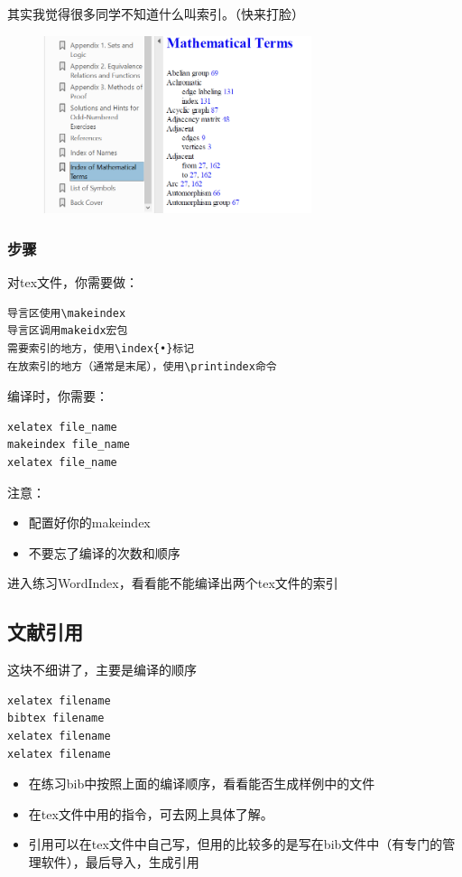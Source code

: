     \begin{frame}[fragile]
    其实我觉得很多同学不知道什么叫索引。（快来打脸）
    \begin{figure}
    \centering
    \includegraphics[width = 0.7\textwidth]{img//index.png}
    \end{figure}
    \end{frame}

    \begin{frame}[fragile]
    \frametitle{步骤}
    对tex文件，你需要做：
\begin{lstlisting}
导言区使用\makeindex
导言区调用makeidx宏包
需要索引的地方，使用\index{•}标记
在放索引的地方（通常是末尾），使用\printindex命令
\end{lstlisting}
    编译时，你需要：
\begin{lstlisting}
xelatex file_name
makeindex file_name
xelatex file_name
\end{lstlisting}
    注意：
    \begin{itemize}
        \item 配置好你的makeindex
        \item 不要忘了编译的次数和顺序
    \end{itemize}
    进入练习WordIndex，看看能不能编译出两个tex文件的索引
    \end{frame}

\subsection{文献引用}

    \begin{frame}[fragile]
        这块不细讲了，主要是编译的顺序
\begin{lstlisting}
xelatex filename
bibtex filename
xelatex filename
xelatex filename
\end{lstlisting}
         \begin{itemize}
             \item 在练习bib中按照上面的编译顺序，看看能否生成样例中的文件
             \item 在tex文件中用的指令，可去网上具体了解。
             \item 引用可以在tex文件中自己写，但用的比较多的是写在bib文件中（有专门的管理软件），最后导入，生成引用
         \end{itemize}
    \end{frame}



